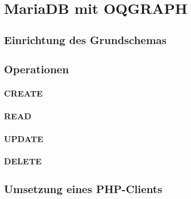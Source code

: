 \setcounter{chapter}{3}

\section{MariaDB mit OQGRAPH}%
\subsection{Einrichtung des Grundschemas}
\subsection{Operationen}
\subsubsection{CREATE}
\subsubsection{READ}
\subsubsection{UPDATE}
\subsubsection{DELETE}
\subsection{Umsetzung eines PHP-Clients}
